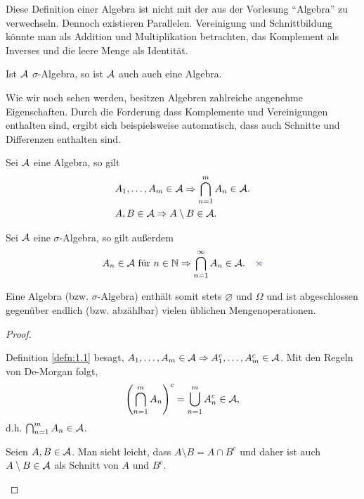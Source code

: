 Diese Definition einer Algebra ist nicht mit der aus der Vorlesung ``Algebra''
zu verwechseln. Dennoch existieren Parallelen. Vereinigung und Schnittbildung
könnte man als Addition und Multiplikation betrachten, das Komplement als
Inverses und die leere Menge als Identität.

\begin{bem}
Ist $\AA$ $\sigma$-Algebra, so ist $\AA$ auch auch eine Algebra.\maphere
\end{bem}

Wie wir noch sehen werden, besitzen Algebren  zahlreiche angenehme
Eigenschaften. Durch die Forderung dass Komplemente und Vereinigungen
enthalten sind, ergibt sich beispielsweise automatisch, dass auch Schnitte und
Differenzen enthalten sind.

\begin{lem}
\label{lem:1.1}
\begin{propenum}
  \item Sei $\AA$ eine Algebra, so gilt
\begin{align*}
&A_1,\ldots,A_m\in\AA \Rightarrow \bigcap_{n=1}^m A_n\in\AA.\\
&A,B\in\AA \Rightarrow A\setminus B \in\AA.
\end{align*}
\item Sei $\AA$ eine $\sigma$-Algebra, so gilt außerdem
\begin{align*}
A_n\in\AA \text{ für }n\in\N \Rightarrow \bigcap_{n=1}^\infty
A_n\in\AA.\fishhere
\end{align*}
\end{propenum}
\end{lem}
Eine Algebra (bzw. $\sigma$-Algebra) enthält somit stets $\varnothing$
und $\Omega$ und ist abgeschlossen gegenüber endlich (bzw. abzählbar) vielen
üblichen Mengenoperationen.
\begin{proof}
\begin{proofenum}
  \item Definition \ref{defn:1.1} besagt, $A_1,\ldots,A_m \in \AA\Rightarrow
  A_1^c,\ldots,A_m^c\in \AA$. Mit den Regeln von De-Morgan folgt,
\begin{align*}
\left(\bigcap_{n=1}^m A_n \right)^c = \bigcup_{n=1}^m A_n^c \in \AA,
\end{align*}
d.h. $\bigcap_{n=1}^m A_n\in\AA$.
\item Seien $A,B\in \AA$. Man sieht leicht, dass $A\setminus B = A\cap B^c$ und
daher ist auch $A\setminus B\in\AA$ als Schnitt von $A$ und $B^c$.\qedhere
\end{proofenum}
\end{proof}

